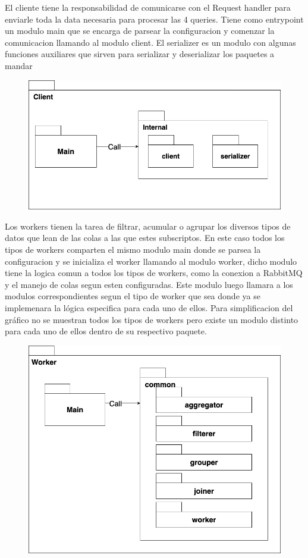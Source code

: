 \documentclass[titlepage,a4paper]{article}
\begin{document}
El cliente tiene la responsabilidad de comunicarse con el Request handler para enviarle toda la data necesaria para procesar las 4 queries. Tiene como entrypoint un modulo main que se encarga de parsear la configuracion y comenzar la comunicacion llamando al modulo client. El serializer es un modulo con algunas funciones auxiliares que sirven para serializar y deserializar los paquetes a mandar
\begin{figure}[H]
    \centering
    \includegraphics[width=0.8\linewidth]{paquete-client.png}
\end{figure}

Los workers tienen la tarea de filtrar, acumular o agrupar los diversos tipos de datos que lean de las colas a las que estes subscriptos. En este caso todos los tipos de workers comparten el mismo modulo main donde se parsea la configuracion y se inicializa el worker llamando al modulo worker, dicho modulo tiene la logica comun a todos los tipos de workers, como la conexion a RabbitMQ y el manejo de colas segun esten configuradas. Este modulo luego llamara a los modulos correspondientes segun el tipo de worker que sea donde ya se implemenara la lógica especifica para cada uno de ellos.
Para simplificacion del gráfico no se muestran todos los tipos de workers pero existe un modulo distinto para cada uno de ellos dentro de su respectivo paquete.
\begin{figure}[H]
    \centering
    \includegraphics[width=0.8\linewidth]{paquete-worker.png}
\end{figure}
\end{document}

